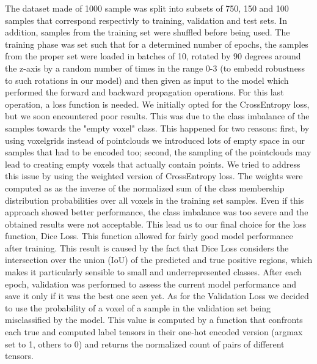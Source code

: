 The dataset made of 1000 sample was split into subsets of 750, 150 and 100 samples that correspond respectivly
to training, validation and test sets. In addition, samples from the training set were shuffled before being used.
The training phase was set such that for a determined number of epochs, the samples from the proper
set were loaded in batches of 10, rotated by 90 degrees around the z-axis by a random number
of times in the range 0-3 (to embedd robustness to such rotations in our model) and then given as 
input to the model which performed the forward and backward propagation operations.
For this last operation, a loss function is needed.
We initially opted for the CrossEntropy loss, but we soon encountered poor results. This was due to the class imbalance of the
samples towards the "empty voxel" class. This happened for two reasons: first, by using voxelgrids instead of pointclouds
we introduced lots of empty space in our samples that had to be encoded too; second, the sampling of the pointclouds may lead 
to creating empty voxels that actually contain points.
We tried to address this issue by using the weighted version of CrossEntropy loss.
The weights were computed as as the inverse of the normalized sum of the class membership distribution probabilities 
over all voxels in the training set samples.
Even if this approach showed better performance, the class imbalance was too severe and the obtained results were not acceptable.
This lead us to our final choice for the loss function, Dice Loss.
This function allowed for fairly good model performance after training. This result is caused by the fact that Dice Loss considers 
the intersection over the union (IoU) of the predicted and true positive regions, which makes it particularly sensible to small 
and underrepresented classes.
After each epoch, validation was performed to assess the current model performance and save it only if 
it was the best one seen yet. 
As for the Validation Loss we decided to use the probability of a voxel of a sample in the validation set being misclassified by the model.
This value is computed by a function that confronts each true and computed label tensors in their one-hot encoded version 
(argmax set to 1, others to 0) and returns the normalized count of pairs of different tensors.
